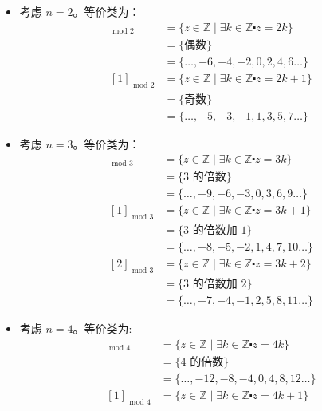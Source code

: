 \begin{itemize}
    \item 考虑 $n=2$。等价类为：
        \begin{align*}
            [0]_{\text{\ mod\ } 2} &= \{z \in \mathbb{Z} \mid \exists k \in \mathbb{Z} \centerdot z = 2k\}\\ 
            &=  \{\text{偶数}\}\\
            &= \{\dots, -6, -4, -2, 0, 2, 4, 6 \dots \}\\
            [1]_{\text{\ mod\ } 2} &= \{z \in \mathbb{Z} \mid \exists k \in \mathbb{Z} \centerdot z = 2k+1\}\\ 
            &=  \{\text{奇数}\}\\
            &= \{\dots, -5, -3, -1, 1, 3, 5, 7 \dots \}
        \end{align*}
    \item 考虑 $n=3$。等价类为：
        \begin{align*}
            [0]_{\text{\ mod\ } 3} &= \{z \in \mathbb{Z} \mid \exists k \in \mathbb{Z} \centerdot z = 3k\}\\
            &=  \{3 \text{\ 的倍数}\}\\
            &= \{\dots, -9, -6, -3, 0, 3, 6, 9 \dots \}\\
            [1]_{\text{\ mod\ } 3} &= \{z \in \mathbb{Z} \mid \exists k \in \mathbb{Z} \centerdot z = 3k+1\}\\ 
            &=  \{3 \text{\ 的倍数加\ } 1\}\\
            &= \{\dots, -8, -5, -2, 1, 4, 7, 10 \dots \}\\
            [2]_{\text{\ mod\ } 3} &= \{z \in \mathbb{Z} \mid \exists k \in \mathbb{Z} \centerdot z = 3k+2\}\\ 
            &=  \{3 \text{\ 的倍数加\ } 2\}\\
            &= \{\dots, -7, -4, -1, 2, 5, 8, 11 \dots \}
        \end{align*}
    \item 考虑 $n=4$。等价类为:
        \begin{align*}
            [0]_{\text{\ mod\ } 4} &= \{z \in \mathbb{Z} \mid \exists k \in \mathbb{Z} \centerdot z = 4k\}\\ 
            &=  \{4 \text{\ 的倍数}\}\\
            &= \{\dots, -12, -8, -4, 0, 4, 8, 12 \dots \}\\
            [1]_{\text{\ mod\ } 4} &= \{z \in \mathbb{Z} \mid \exists k \in \mathbb{Z} \centerdot z = 4k+1\}\\

\end{align*}
\end{itemize}
